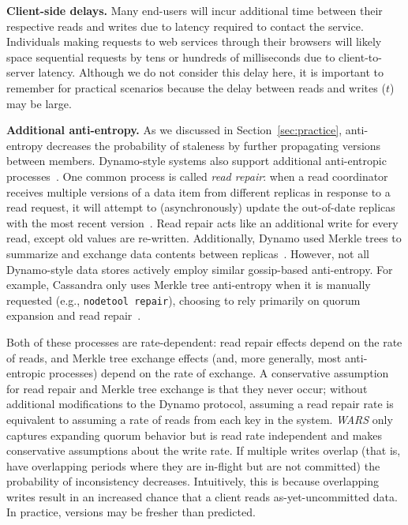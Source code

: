 \documentclass{vldb}
\begin{document}
\textbf{Client-side delays.} Many end-users will incur additional time
between their respective reads and writes due to latency required to
contact the service.  Individuals making requests to web services
through their browsers will likely space sequential requests by tens
or hundreds of milliseconds due to client-to-server latency.  Although
we do not consider this delay here, it is important to remember for
practical scenarios because the delay between reads and writes ($t$)
may be large.

\textbf{Additional anti-entropy.} As we discussed in
Section~\ref{sec:practice}, anti-entropy decreases the probability of
staleness by further propagating versions between members.
Dynamo-style systems also support additional anti-entropic
processes~\cite{nosql}.  One common process is called \textit{read
  repair}: when a read coordinator receives multiple versions of a
data item from different replicas in response to a read request, it
will attempt to (asynchronously) update the out-of-date replicas with
the most recent version~\cite{dynamo}.  Read repair acts like an
additional write for every read, except old values are re-written.
Additionally, Dynamo used Merkle trees to summarize and exchange data
contents between replicas~\cite[Section 4.7]{dynamo}.  However, not
all Dynamo-style data stores actively employ similar gossip-based
anti-entropy.  For example, Cassandra only uses Merkle tree
anti-entropy when it is manually requested (e.g., \texttt{nodetool
  repair}), choosing to rely primarily on quorum expansion and read
repair~\cite{cassandra-merkle}.

Both of these processes are rate-dependent: read repair effects depend
on the rate of reads, and Merkle tree exchange effects (and, more
generally, most anti-entropic processes) depend on the rate of
exchange.  A conservative assumption for read repair and Merkle tree
exchange is that they never occur; without additional modifications to
the Dynamo protocol, assuming a read repair rate is equivalent to
assuming a rate of reads from each key in the system.  \textit{WARS}
only captures expanding quorum behavior but is read rate independent
and makes conservative assumptions about the write rate.  If multiple
writes overlap (that is, have overlapping periods where they are
in-flight but are not committed) the probability of inconsistency
decreases.  Intuitively, this is because overlapping writes result in
an increased chance that a client reads as-yet-uncommitted data.  In
practice, versions may be fresher than predicted.
\end{document}
